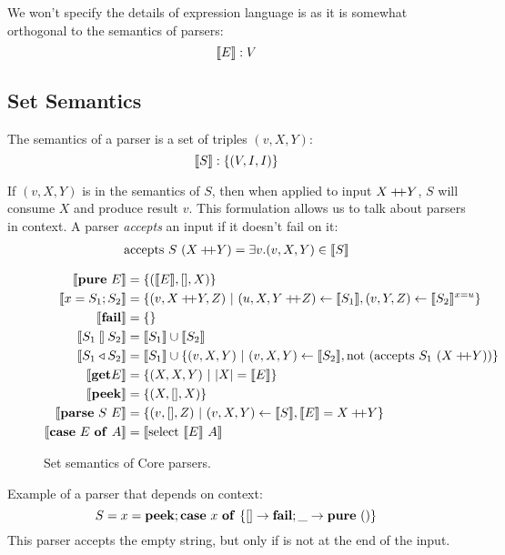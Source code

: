 \documentclass{article}
\begin{document}
We won't specify the details of expression language is as it is
somewhat orthogonal to the semantics of parsers:
\[
\llbracket{E}\rrbracket : V
\]


\subsection{Set Semantics}

The semantics of a parser is a set of triples $(v,X,Y)$:
\[
\llbracket{S}\rrbracket : \{{ (V,I,I) }\}
\]

If $(v,X,Y)$ is in the semantics of $S$, then when applied to
input $X +\!\!\!+ Y$, $S$ will consume $X$ and produce result $v$.
This formulation allows us to talk about parsers in context.
A parser {\em accepts} an input if it doesn't fail on it:
\begin{align*}
\mathrm{accepts}~ S~(X +\!\!\!+ Y) &= \exists v. (v,X,Y) \in \llbracket{S}\rrbracket \\
\end{align*}

\begin{figure}[H]
\begin{align*}
\sem {\gPure E} &= \set{ (\sem E, [], X) } \\
\sem {\gBind x {S_1} {S_2}} &=
  \set{ (v,X \append Y,Z) ~|~ (u,X,Y \append Z) \from \sem{S_1},
                              (v,Y,Z)           \from \sem{S_2}^{x=u} } \\
\sem{\gFail} &= \set{ } \\
\sem{\gOr {S_1} {S_2}} &= \sem{S_1} \union \sem{S_2} \\
\sem{\gOrB {S_1} {S_2}} &= \sem{S_1} \union
  \set { (v,X,Y) ~|~ (v,X,Y) \from \sem{S_2},
                     \fun{not} (\fun{accepts} S_1~(X \append Y)) } \\
\sem{\gGet E} &= \set{ (X, X, Y) ~|~ |X| = \sem{E} } \\
\sem{\gGetS}  &= \set{ (X, [], X) } \\
\sem{\gParse S E} &= \set{ (v,[],Z) ~|~ (v,X,Y) \from \sem{S},
                                        \sem{E} = X \append Y} \\
\sem{\gCase E A} &= \sem {\caseSelect {\sem E} A}
\end{align*}
\caption{Set semantics of Core parsers.}
\end{figure}

Example of a parser that depends on context:
\begin{equation*}
S = {x} = {\mathbf{peek}}; {\mathbf{case}~{x}~\mathbf{of}~{\{{[] \to \mathbf{fail}; \_ \to \mathbf{pure}~{()}}\}}}
\end{equation*}
This parser accepts the empty string, but only if is not at the end
of the input.
\end{document}
